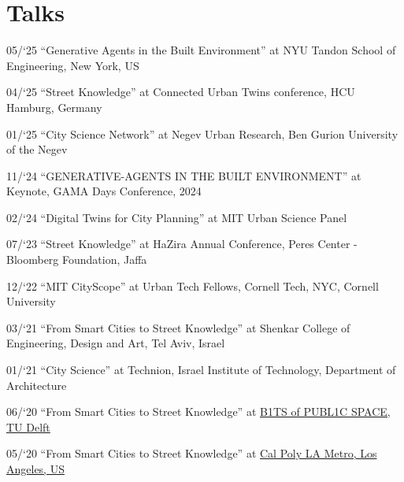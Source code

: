 \section*{Talks}

\begin{tablist}

    \item[05/`25] \tab \enquote{Generative Agents in the Built Environment} at
    {NYU Tandon School of Engineering, New York, US}

    \item[04/`25] \tab \enquote{Street Knowledge} at
    {Connected Urban Twins conference, HCU Hamburg, Germany}

    \item[01/`25] \tab \enquote{City Science Network} at
    {Negev Urban Research, Ben Gurion University of the Negev}

    \item[11/`24] \tab \enquote{GENERATIVE-AGENTS IN THE BUILT ENVIRONMENT} at
    {Keynote, GAMA Days Conference, 2024}

    \item[02/`24] \tab \enquote{Digital Twins for City Planning} at
    {MIT Urban Science Panel}

    \item[07/`23] \tab \enquote{Street Knowledge} at
    {HaZira Annual Conference, Peres Center - Bloomberg Foundation, Jaffa}

    \item[12/`22] \tab \enquote{MIT CityScope} at
    {Urban Tech Fellows, Cornell Tech, NYC, Cornell University}

    \item[03/`21] \tab \enquote{From Smart Cities to Street Knowledge} at
    {Shenkar College of Engineering, Design and Art, Tel Aviv, Israel}

    \item[01/`21] \tab \enquote{City Science} at
    {Technion, Israel Institute of Technology, Department of Architecture}

    \item[06/`20] \tab \enquote{From Smart Cities to Street Knowledge} at
    \href{http://www.polistudelft.nl/urbanism-week/b1ts-of-publ1c-space-3-0/}{B1TS of PUBL1C SPACE, TU Delft}

    \item[05/`20] \tab \enquote{From Smart Cities to Street Knowledge} at
    \href{https://www.youtube.com/watch?v=Rh5ks9x3720}{Cal Poly LA Metro, Los Angeles, US}


\end{tablist}
